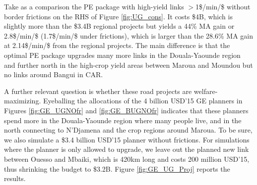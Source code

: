 \documentclass[a4paper]{article}
\begin{document}

Take as a comparison the PE package with high-yield links $>$1\$/min/\$ without border frictions on the RHS of Figure \ref{fig:UG_cons}. It costs \$4B, which is slightly more than the \$3.4B regional projects but yields a 44\% MA gain or 2.8\$/min/\$ (1.7\$/min/\$ under frictions), which is larger than the 28.6\% MA gain at 2.14\$/min/\$ from the regional projects. The main difference is that the optimal PE package upgrades many more links in the Douala-Yaounde region and further north in the high-crop yield areas between Maroua and Moundou but no links around Bangui in CAR. \newline 

A further relevant question is whether these road projects are welfare-maximizing. Eyeballing the allocations of the 4 billion USD'15 GE planners in Figures \ref{fig:GE_UGNOfr} and \ref{fig:GE_BUGNOfr} indicates that these planners spend more in the Douala-Yaounde region where many people live, and in the north connecting to N'Djamena and the crop regions around Maroua. To be sure, we also simulate a \$3.4 billion USD'15 planner without frictions. For simulations where the planner is only allowed to upgrade, we leave out the planned new link between Ouesso and Mbaiki, which is 420km long and costs 200 million USD'15, thus shrinking the budget to \$3.2B. Figure \ref{fig:GE_UG_Proj} reports the results. 
\end{document}
